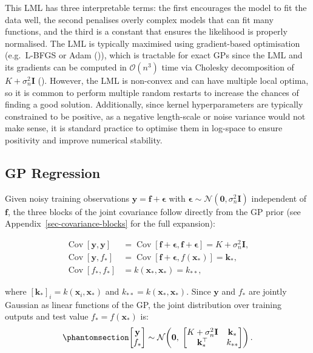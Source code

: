 \documentclass[
  letterpaper,
  DIV=11,
  numbers=noendperiod]{scrartcl}
\begin{document}
This LML has three interpretable terms: the first encourages the model
to fit the data well, the second penalises overly complex models that
can fit many functions, and the third is a constant that ensures the
likelihood is properly normalised. The LML is typically maximised using
gradient-based optimisation (e.g.~L-BFGS or Adam
()), which is
tractable for exact GPs since the LML and its gradients can be computed
in \(\mathcal{O}(n^3)\) time via Cholesky decomposition of
\(K + \sigma_n^2\mathbf{I}\)
().
However, the LML is non-convex and can have multiple local optima, so it
is common to perform multiple random restarts to increase the chances of
finding a good solution. Additionally, since kernel hyperparameters are
typically constrained to be positive, as a negative length-scale or
noise variance would not make sense, it is standard practice to optimise
them in log-space to ensure positivity and improve numerical stability.

\subsection{GP Regression}\label{sec-gp-regression}

Given noisy training observations
\(\mathbf{y} = \mathbf{f} + \boldsymbol{\epsilon}\) with
\(\boldsymbol{\epsilon} \sim \mathcal{N}(\mathbf{0}, \sigma_n^2 \mathbf{I})\)
independent of \(\mathbf{f}\), the three blocks of the joint covariance
follow directly from the GP prior (see
Appendix~\ref{sec-covariance-blocks} for the full expansion):

\[
\begin{aligned}
\operatorname{Cov}[\mathbf{y}, \mathbf{y}] &= \operatorname{Cov}[\mathbf{f} + \boldsymbol{\epsilon}, \mathbf{f} + \boldsymbol{\epsilon}] = K + \sigma_n^2 \mathbf{I}, \\
\operatorname{Cov}[\mathbf{y}, f_*] &= \operatorname{Cov}[\mathbf{f} + \boldsymbol{\epsilon}, f(\mathbf{x}_*)] = \mathbf{k}_*, \\
\operatorname{Cov}[f_*, f_*] &= k(\mathbf{x}_*, \mathbf{x}_*) = k_{**},
\end{aligned}
\]

where \([\mathbf{k}_*]_i = k(\mathbf{x}_i, \mathbf{x}_*)\) and
\(k_{**} = k(\mathbf{x}_*, \mathbf{x}_*)\). Since \(\mathbf{y}\) and
\(f_*\) are jointly Gaussian as linear functions of the GP, the joint
distribution over training outputs and test value
\(f_* = f(\mathbf{x}_*)\) is:
\begin{equation}\phantomsection\label{eq-joint-gp}{
\begin{bmatrix} \mathbf{y} \\ f_* \end{bmatrix}
\sim
\mathcal{N}\!\left(
\mathbf{0},\;
\begin{bmatrix} K + \sigma_n^2 \mathbf{I} & \mathbf{k}_* \\ \mathbf{k}_*^\top & k_{**} \end{bmatrix}
\right).
}\end{equation}
\end{document}
